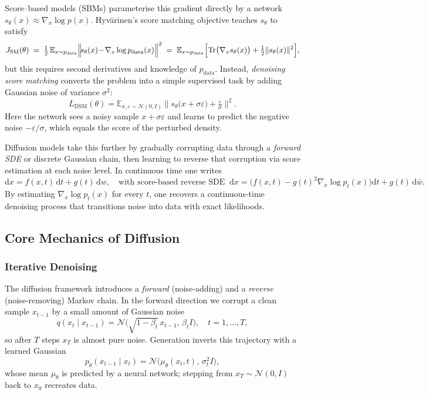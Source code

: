 \documentclass{article}
\begin{document}
Score–based models (SBMs) parameterise this gradient directly by a network \(s_\theta(x)\approx\nabla_x\log p(x)\).  Hyvärinen’s score matching objective teaches \(s_\theta\) to satisfy
\[
  J_{\text{SM}}(\theta)
  \;=\;
  \tfrac12\,\mathbb{E}_{x\sim p_{\text{data}}}
    \Bigl\|\!s_\theta(x)\!-\!\nabla_x\log p_{\text{data}}(x)\Bigr\|^2
  \;=\;
  \mathbb{E}_{x\sim p_{\text{data}}}
  \Bigl[\mathrm{Tr}\bigl(\nabla_x s_\theta(x)\bigr)
        +\tfrac12\|s_\theta(x)\|^2\Bigr],
\]
but this requires second derivatives and knowledge of \(p_{\text{data}}\).  Instead, \emph{denoising score matching} converts the problem into a simple supervised task by adding Gaussian noise of variance \(\sigma^2\):
\[
  L_{\text{DSM}}(\theta)
  = \mathbb{E}_{x,\varepsilon\sim\mathcal N(0,I)}
  \bigl\|
    s_\theta\bigl(x+\sigma\varepsilon\bigr)
    + \tfrac{\varepsilon}{\sigma}
  \bigr\|^2.
\]
Here the network sees a noisy sample \(x+\sigma\varepsilon\) and learns to predict the negative noise \(-\varepsilon/\sigma\), which equals the score of the perturbed density.

Diffusion models take this further by gradually corrupting data through a \emph{forward SDE} or discrete Gaussian chain, then learning to reverse that corruption via score estimation at each noise level.  In continuous time one writes
\[
  \mathrm{d}x = f(x,t)\,\mathrm{d}t + g(t)\,\mathrm{d}w,
  \quad
  \text{with score‑based reverse SDE}
  \;\;
  \mathrm{d}x = \bigl(f(x,t)-g(t)^2\nabla_x\log p_t(x)\bigr)\mathrm{d}t + g(t)\,\mathrm{d}\bar w.
\]
By estimating \(\nabla_x\log p_t(x)\) for every \(t\), one recovers a continuous‑time denoising process that transitions noise into data with exact likelihoods.

\subsection{Core Mechanics of Diffusion}

\subsubsection*{Iterative Denoising}
The diffusion framework introduces a \emph{forward} (noise‑adding) and a \emph{reverse} (noise‑removing) Markov chain.  In the forward direction we corrupt a clean sample \(x_{t-1}\) by a small amount of Gaussian noise
\[
  q(x_t\mid x_{t-1})
    = \mathcal{N}\bigl(\sqrt{1-\beta_t}\,x_{t-1},\,\beta_t I\bigr),
  \quad t=1,\dots,T,
\]
so after \(T\) steps \(x_T\) is almost pure noise.  Generation inverts this trajectory with a learned Gaussian  
\[
  p_\theta(x_{t-1}\mid x_t)
    = \mathcal{N}\bigl(\mu_\theta(x_t,t),\,\sigma_t^2 I\bigr),
\]
whose mean \(\mu_\theta\) is predicted by a neural network; stepping from \(x_T\sim\mathcal N(0,I)\) back to \(x_0\) recreates data.
\end{document}
